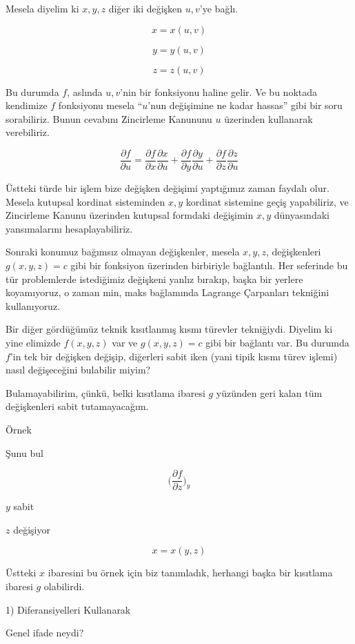 \documentclass[12pt,fleqn]{article}\usepackage{../../common}
\begin{document}
Mesela diyelim ki $x,y,z$ diğer iki değişken $u,v$'ye bağlı. 

$$ x = x(u,v) $$

$$ y = y(u,v) $$

$$ z = z(u,v) $$

Bu durumda $f$, aslında $u,v$'nin bir fonksiyonu haline gelir. Ve bu
noktada kendimize $f$ fonksiyonu mesela ``$u$'nun değişimine ne kadar
hassas'' gibi bir soru sorabiliriz. Bunun cevabını Zincirleme Kanununu $u$
üzerinden kullanarak verebiliriz.

$$ 
\frac{\partial f}{\partial u} = 
\frac{\partial f}{\partial x}\frac{\partial x}{\partial u} + 
\frac{\partial f}{\partial y}\frac{\partial y}{\partial u} + 
\frac{\partial f}{\partial z}\frac{\partial z}{\partial u} 
$$

Üstteki türde bir işlem bize değişken değişimi yaptığımız zaman faydalı
olur. Mesela kutupsal kordinat sisteminden $x,y$ kordinat sistemine geçiş
yapabiliriz, ve Zincirleme Kanunu üzerinden kutupsal formdaki değişimin $x,y$
dünyasındaki yansımalarını hesaplayabiliriz. 

Sonraki konumuz bağımsız olmayan değişkenler, mesela $x,y,z$, değişkenleri
$g(x,y,z)=c$ gibi bir fonksiyon üzerinden birbiriyle bağlantılı. Her
seferinde bu tür problemlerde istediğimiz değişkeni yanlız bırakıp, başka
bir yerlere koyamıyoruz, o zaman min, maks bağlamında Lagrange Çarpanları
tekniğini kullanıyoruz.

Bir diğer gördüğümüz teknik kısıtlanmış kısmı türevler tekniğiydi. Diyelim
ki yine elimizde $f(x,y,z)$ var ve $g(x,y,z)=c$ gibi bir bağlantı var. Bu
durumda $f$'in tek bir değişken değişip, diğerleri sabit iken (yani tipik
kısmı türev işlemi) nasıl değişeceğini bulabilir miyim? 

Bulamayabilirim, çünkü, belki kısıtlama ibaresi $g$ yüzünden geri kalan tüm
değişkenleri sabit tutamayacağım.

Örnek 

Şunu bul

$$ 
\bigg( 
\frac{\partial f}{\partial z}
\bigg)_{y}
$$

$y$ sabit

$z$ değişiyor

$$ x = x(y,z) $$

Üstteki $x$ ibaresini bu örnek için biz tanımladık, herhangi başka bir
kısıtlama ibaresi $g$ olabilirdi. 

1) Diferansiyelleri Kullanarak

Genel ifade neydi?
\end{document}
